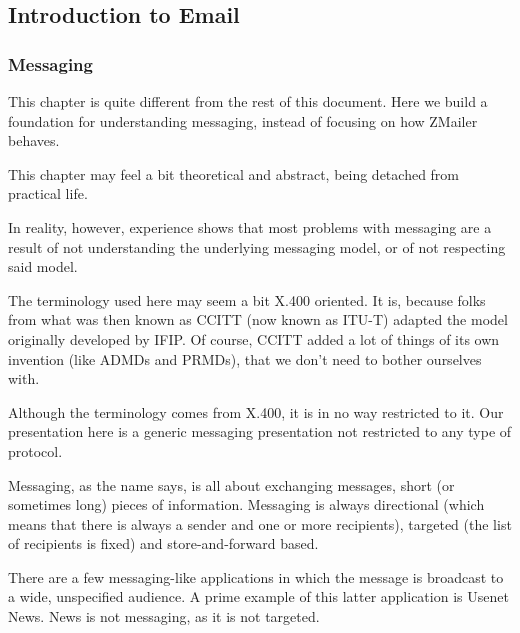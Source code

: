 \startdocument

\subsection{Introduction to Email}

\subsubsection{Messaging}

This chapter is quite different from the rest of this document.
Here we build a foundation for understanding messaging, instead
of focusing on how ZMailer behaves.

This chapter may feel a bit theoretical and abstract, being detached
from practical life.

In reality, however, experience shows that most problems with messaging
are a result of not understanding the underlying messaging model, or of
not respecting said model.

The terminology used here may seem a bit X.400 oriented.
It is, because folks from what was then known as CCITT (now known as ITU-T)
adapted the model originally developed by IFIP.
Of course, CCITT added a lot of things of its own invention (like
ADMDs and PRMDs), that we don't need to bother ourselves with.

Although the terminology comes from X.400, it is in no way restricted to it.
Our presentation here is a generic messaging presentation not restricted
to any type of protocol.

Messaging, as the name says, is all about exchanging messages,
short (or sometimes long) pieces of information.
Messaging is always directional (which means that there is always
a sender and one or more recipients), targeted (the list of recipients
is fixed) and store-and-forward based.

There are a few messaging-like applications in which the message is
broadcast to a wide, unspecified audience.
A prime example of this latter application is Usenet News.
News is not messaging, as it is not targeted.

